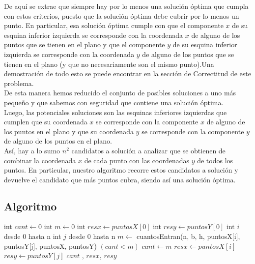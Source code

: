 \indent  De aqu\'i se extrae que siempre hay por lo menos una solución \'optima que cumpla con estos criterios, puesto que la soluci\'on \'optima debe cubrir por lo menos un punto. En particular, esa soluci\'on \'optima cumple con que el componente $x$ de su esquina inferior izquierda se corresponde con la coordenada $x$ de alguno de los puntos que se tienen en el plano y que el componente $y$ de su esquina inferior izquierda se corresponde con la coordenada $y$ de alguno de los puntos que se tienen en el plano (y que no necesariamente son el mismo punto).Una demostraci\'on de todo esto se puede encontrar en la secci\'on de Correctitud de este problema.\\
\indent De esta manera hemos reducido el conjunto de posibles soluciones a uno m\'as pequeño y que sabemos con seguridad que contiene una soluci\'on \'optima.\\ 
\indent Luego, las potenciales soluciones son las esquinas inferiores izquierdas que cumplen que su coordenada $x$ se corresponde con la componente $x$ de alguno de los puntos en el plano y que su coordenada $y$ se corresponde con la componente $y$ de alguno de los puntos en el plano.\\
\indent As\'i, hay a lo sumo $n^{2}$ candidatos a soluci\'on a analizar que se obtienen de combinar la coordenada $x$ de cada punto con las coordenadas $y$ de todos los puntos. En particular, nuestro algoritmo recorre estos candidatos a soluci\'on y devuelve el candidato que m\'as puntos cubra, siendo as\'i una soluci\'on \'optima.\\

\subsection{Algoritmo} 

\begin{algorithm}[H]
\caption{} 
\begin{codebox}
\li int $cant \gets 0$
\li int $m \gets 0$
\li int $resx \gets puntosX[0]$
\li int $resy \gets puntosY[0]$
\li \For int $i$ desde 0 hasta n \Do
\li		\For int $j$ desde 0 hasta n \Do
\li 		$m \gets $ cuantosEntran(n, b, h, puntosX[i], puntosY[j], puntosX, puntosY)
\li 		\If $(cant<m)$ 
\li				\Then   $cant \gets m$
\li 					$resx \gets puntosX[i]$
\li 					$resy \gets puntosY[j]$
				\End
			\End
		\End
	\End
\li \Return $cant$ , $resx$, $resy$

\End
\end{codebox}
\end{algorithm}



